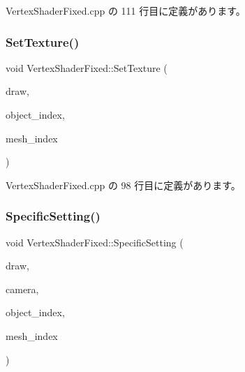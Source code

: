  Vertex\+Shader\+Fixed.\+cpp の 111 行目に定義があります。

\mbox{\label{class_vertex_shader_fixed_a1caad0cf4c86788ed17c2a8da8645414}} 
\subsubsection{\texorpdfstring{Set\+Texture()}{SetTexture()}}
{\footnotesize\ttfamily void Vertex\+Shader\+Fixed\+::\+Set\+Texture (\begin{DoxyParamCaption}\item[{\mbox{\hyperlink{class_draw_base}{Draw\+Base}} $\ast$}]{draw,  }\item[{unsigned}]{object\+\_\+index,  }\item[{unsigned}]{mesh\+\_\+index }\end{DoxyParamCaption})\hspace{0.3cm}{\ttfamily [private]}}



 Vertex\+Shader\+Fixed.\+cpp の 98 行目に定義があります。

\mbox{\label{class_vertex_shader_fixed_a87523c320f6f6767d59d7b24265db7ec}} 
\subsubsection{\texorpdfstring{Specific\+Setting()}{SpecificSetting()}}
{\footnotesize\ttfamily void Vertex\+Shader\+Fixed\+::\+Specific\+Setting (\begin{DoxyParamCaption}\item[{\mbox{\hyperlink{class_draw_base}{Draw\+Base}} $\ast$}]{draw,  }\item[{\mbox{\hyperlink{class_camera}{Camera}} $\ast$}]{camera,  }\item[{unsigned}]{object\+\_\+index,  }\item[{unsigned}]{mesh\+\_\+index }\end{DoxyParamCaption})\hspace{0.3cm}{\ttfamily [virtual]}}



